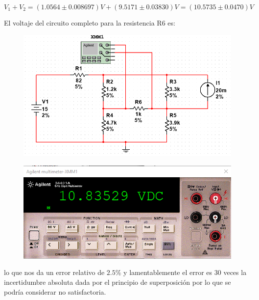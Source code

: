 \documentclass[12pt,a4paper]{article}
\begin{document}
\begin{enumerate}
\begin{equation*}
    V_1 + V_2 = (1.0564 \pm 0.008697) V + (9.5171 \pm 0.03830) V = (10.5735 \pm 0.0470) V
\end{equation*}

El voltaje del circuito completo para la resistencia R6 es:



\begin{figure}[h!]
    \centering
    \includegraphics[scale=0.4]{1.completo.PNG}

    \label{fig:my_label}
\end{figure}

\begin{figure}[h!]
    \centering
    \includegraphics[scale=0.5]{1.completo.multi.PNG}

    \label{fig:my_label}
\end{figure}

lo que nos da un error relativo de $2.5\%$ y lamentablemente el error es 30 veces la incertidumbre absoluta dada por el principio de superposición por lo que se podría considerar no satisfactoria. 



\newpage




\end{enumerate}
\end{document}
